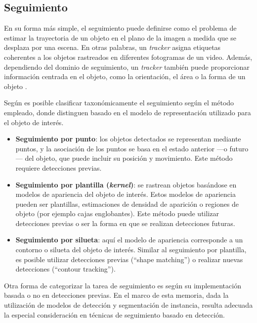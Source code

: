 \subsection{Seguimiento}

En su forma más simple, el seguimiento puede definirse como el problema de estimar la trayectoria de un objeto en el plano de la imagen a medida que se desplaza por una escena. En otras palabras, un \textit{tracker} asigna etiquetas coherentes a los objetos rastreados en diferentes fotogramas de un video. Además, dependiendo del dominio de seguimiento, un \textit{tracker} también puede proporcionar información centrada en el objeto, como la orientación, el área o la forma de un objeto \cite{Yilmaz2006}.

Según \cite[Yilmaz et al.]{Yilmaz2006} es posible clasificar taxonómicamente el seguimiento según el método empleado, donde distinguen basado en el modelo de representación utilizado para el objeto de interés.

\begin{itemize}
    \item \textbf{Seguimiento por punto}: los objetos detectados se representan mediante puntos, y la asociación de los puntos se basa en el estado anterior ---o futuro--- del objeto, que puede incluir su posición y movimiento. Este método requiere detecciones previas.
    \item \textbf{Seguimiento por plantilla (\textit{kernel})}: se rastrean objetos basándose en modelos de apariencia del objeto de interés. Estos modelos de apariencia pueden ser plantillas, estimaciones de densidad de aparición o regiones de objeto (por ejemplo cajas englobantes). Este método puede utilizar detecciones previas o ser la forma en que se realizan detecciones futuras.
    \item \textbf{Seguimiento por silueta}: aquí el modelo de apariencia corresponde a un contorno o silueta del objeto de interés. Similar al seguimiento por plantilla, es posible utilizar detecciones previas (``shape matching'') o realizar nuevas detecciones (``contour tracking'').
\end{itemize}

Otra forma de categorizar la tarea de seguimiento es según su implementación basada o no en detecciones previas. En el marco de esta memoria, dada la utilización de modelos de detección y segmentación de instancia, resulta adecuada la especial consideración en técnicas de seguimiento basado en detección.

